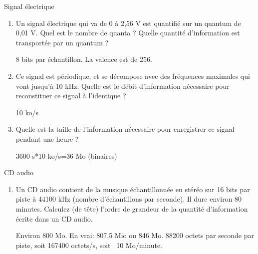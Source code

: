 \begin{exercice}
  \begin{exercicelet}{Signal électrique}
    \begin{enumerate}
    \item Un signal électrique qui va de 0 à 2,56 V est quantifié sur un quantum
      de 0,01 V. Quel est le nombre de quanta ? Quelle quantité d'information
      est transportée par un quantum ?
      \begin{xcorrection}
        8 bits par échantillon. La valence est de 256.
      \end{xcorrection}
    \item Ce signal est périodique, et se décompose avec des fréquences
      maximales qui vont jusqu'à 10 kHz. Quelle est le débit d'information
      nécessaire pour reconstituer ce signal à l'identique ?
      \begin{xcorrection}
        10 ko/s
      \end{xcorrection}
    \item Quelle est la taille de l'information nécessaire pour enregistrer ce
      signal pendant une heure ?
      \begin{xcorrection}
        3600 s*10 ko/s=36 Mo (binaires)
      \end{xcorrection}
    \end{enumerate}
  \end{exercicelet}
  \begin{exercicelet}{CD audio}
    \begin{enumerate}
    \item Un CD audio contient de la musique échantillonnée en stéréo sur 16
      bits par piste à 44100 kHz (nombre d'échantillons par seconde). Il dure
      environ 80 minutes. Calculez (de tête) l'ordre de grandeur de la
      quantité d'information écrite dans un CD audio.
      \begin{xcorrection}
        Environ 800 Mo. En vrai: 807,5 Mio ou 846 Mo.
        88200 octets par seconde par piste, soit 167400 octets/s, soit ~10 Mo/minute.
      \end{xcorrection}
    \end{enumerate}
  \end{exercicelet}
\end{exercice}


